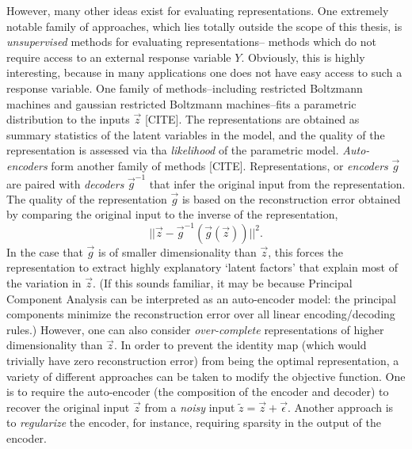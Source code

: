 However, many other ideas exist for evaluating representations.  One
extremely notable family of approaches, which lies totally outside the
scope of this thesis, is \emph{unsupervised} methods for evaluating
representations-- methods which do not require access to an external
response variable $Y$.  Obviously, this is highly interesting, because
in many applications one does not have easy access to such a response
variable.  One family of methods--including restricted Boltzmann
machines and gaussian restricted Boltzmann machines--fits a parametric
distribution to the inputs $\vec{z}$ [CITE].  The representations are
obtained as summary statistics of the latent variables in the model,
and the quality of the representation is assessed via tha
\emph{likelihood} of the parametric model.  \emph{Auto-encoders} form
another family of methods [CITE].  Representations, or \emph{encoders}
$\vec{g}$ are paired with \emph{decoders} $\vec{g}^{-1}$ that infer
the original input from the representation.  The quality of the
representation $\vec{g}$ is based on the reconstruction error obtained
by comparing the original input to the inverse of the representation,
\[
||\vec{z} - \vec{g}^{-1}(\vec{g}(\vec{z}))||^2.
\]
In the case that $\vec{g}$ is of smaller dimensionality than
$\vec{z}$, this forces the representation to extract highly
explanatory `latent factors' that explain most of the variation in
$\vec{z}$.  (If this sounds familiar, it may be because Principal
Component Analysis can be interpreted as an auto-encoder model: the
principal components minimize the reconstruction error over all linear
encoding/decoding rules.)  However, one can also consider
\emph{over-complete} representations of higher dimensionality than
$\vec{z}$.  In order to prevent the identity map (which would
trivially have zero reconstruction error) from being the optimal
representation, a variety of different approaches can be taken to
modify the objective function.  One is to require the auto-encoder
(the composition of the encoder and decoder) to recover the original
input $\vec{z}$ from a \emph{noisy} input $\tilde{z} = \vec{z} +
\vec{\epsilon}$.  Another approach is to \emph{regularize} the
encoder, for instance, requiring sparsity in the output of the
encoder.

